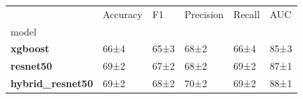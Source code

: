 \begin{tabular}{llllll}
\toprule
 & Accuracy & F1 & Precision & Recall & AUC \\
model &  &  &  &  &  \\
\midrule
\textbf{xgboost} & 66±4 & 65±3 & 68±2 & 66±4 & 85±3 \\
\textbf{resnet50} & 69±2 & 67±2 & 68±2 & 69±2 & 87±1 \\
\textbf{hybrid_resnet50} & 69±2 & 68±2 & 70±2 & 69±2 & 88±1 \\
\bottomrule
\end{tabular}
